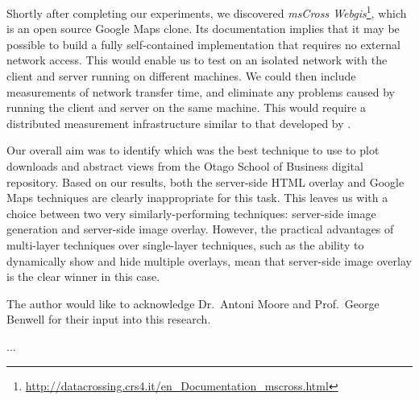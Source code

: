 \documentclass[acmnow]{acmtrans2m}
\begin{document}
Shortly after completing our experiments, we discovered \emph{msCross
Webgis}\footnote{\url{http://datacrossing.crs4.it/en_Documentation_mscross.html}},
which is an open source Google Maps clone. Its documentation implies
that it may be possible to build a fully self-contained implementation
that requires no external network access. This would enable us to test
on an isolated network with the client and server running on different
machines. We could then include measurements of network transfer time,
and eliminate any problems caused by running the client and server on
the same machine. This would require a distributed measurement
infrastructure similar to that developed by .

Our overall aim was to identify which was the best technique to use to
plot downloads and abstract views from the Otago School of Business
digital repository. Based on our results, both the server-side HTML
overlay and Google Maps techniques are clearly inappropriate for this
task. This leaves us with a choice between two very similarly-performing
techniques: server-side image generation and server-side image overlay.
However, the practical advantages of multi-layer techniques over
single-layer techniques, such as the ability to dynamically show and
hide multiple overlays, mean that server-side image overlay is the clear
winner in this case.


\begin{acks}
The author would like to acknowledge Dr.\ Antoni Moore and Prof.\ George
Benwell for their input into this research.
\end{acks}





\begin{received}
...
\end{received}
\end{document}
